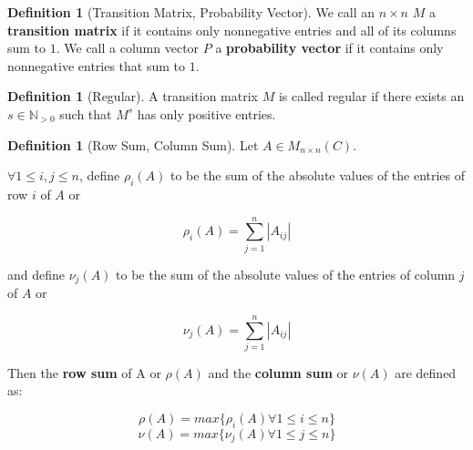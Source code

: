 \documentclass{amsart}
\theoremstyle{definition}
\newtheorem{definition}[thm]{Definition}
\theoremstyle{remark}
\numberwithin{equation}{section}
\begin{document}
\begin{definition}[Transition Matrix, Probability Vector]
We call an $n \times n$ $M$ a \textbf{transition matrix} if it contains only nonnegative entries and all of its columns sum to $1$.
We call a column vector $P$ a \textbf{probability vector} if it contains only nonnegative entries that sum to $1$.


\begin{comment}
 an and let $v$ be any column vector in $\mathbb{R}^n$ having nonnegative coordinates.
Let $u \in \mathbb{R}^n$ be the column vector with each coordinate equal to $1$.

Then we say $M$ is a \textbf{transition matrix} if $M^tu = u.
Additionally, $v$ is a probability vector if $u^tv = (1)$.

We call an $M$ be any $n \times n$ matrix with real, nonnegative entries an and let $v$ be any column vector in $\mathbb{R}^n$ having nonnegative coordinates.
Let $u \in \mathbb{R}^n$ be the column vector with each coordinate equal to $1$.

Then we say $M$ is a \textbf{transition matrix} if $M^tu = u.
Additionally, $v$ is a probability vector if $u^tv = (1)$.


\end{comment}

\end{definition}

\begin{definition}[Regular]
A transition matrix $M$ is called regular if there exists an $s \in \mathbb{N}_{>0}$ such that $M^s$ has only positive entries.

\end{definition}

\begin{definition}[Row Sum, Column Sum]
Let $A \in M_{n \times n }(C)$.

$\forall 1 \leq i, j \leq n$, define $\rho_i(A)$ to be the sum of the absolute values of the entries of row $i$ of $A$ or 

$$ \rho_i(A) = \sum_{j=1}^n|A_{ij}| $$

and define $\nu_j(A)$ to be the sum of the absolute values of the entries of column $j$ of $A$ or 

$$ \nu_j(A) = \sum_{j=1}^n|A_{ij}| $$

Then the \textbf{row sum} of A or $\rho(A)$ and the \textbf{column sum} or $\nu(A)$ are defined as:

$$ \rho(A) = max\{\rho_i(A) \forall 1 \leq i \leq n \} $$
$$ \nu(A) = max\{\nu_j(A) \forall 1 \leq j \leq n \} $$


\end{definition}
\end{document}
